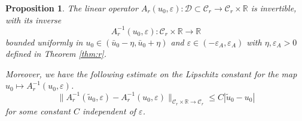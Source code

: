 \documentclass[letterpaper,11pt]{article}
\newcommand{\eps}{\varepsilon}
\numberwithin{equation}{section}
\theoremstyle{plain}
\newtheorem{proposition}[theorem]{Proposition}
\begin{document}
\begin{proposition}\label{inv_A_r}
The linear operator $A_r(u_0,\eps) : \mathcal{D}\subset \mathcal{C}_r \to \mathcal{C}_r\times \mathbb{R}$ is invertible, with its inverse 
\[
A_r^{-1}(u_0,\eps) : \mathcal{C}_r \times \mathbb{R} \to \mathbb{R}
\]
bounded uniformly in $u_0 \in (\bar{u}_0-\eta, \bar{u}_0+\eta)$ and $\eps \in (-\eps_A,\eps_A)$ with $\eta, \eps_A >0$ defined in Theorem \ref{thm:r}.

Moreover, we have the following estimate on the Lipschitz constant for the map $u_0 \mapsto A_r^{-1}(u_0,\eps)$.
\begin{equation}\label{Lip:Ar_inv}
\|A_r^{-1}(\tilde{u}_0,\eps) - A_r^{-1}(u_0,\eps)\|_{\mathcal{C}_r\times\mathbb{R}\to \mathcal{C}_r} \le C|\tilde{u}_0-u_0|
\end{equation}
for some constant $C$ independent of $\eps$.
\end{proposition}
\end{document}
